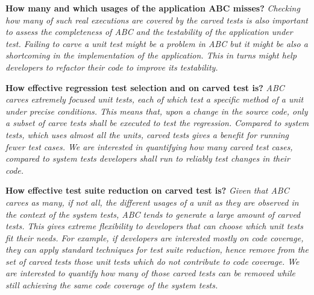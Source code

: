 \documentclass[10pt,conference]{IEEEtran}
\newcommand{\abc}{\textsf{ABC}\xspace}
\begin{document}
\begin{RQ}
\textbf{How many and which usages of the application \abc misses?}
\emph{Checking how many of such real executions are covered by the carved tests is also
important to assess the completeness of \abc and the testability of the application under test.
Failing to carve a unit test might be a problem in \abc but it might be also a shortcoming in the
implementation of the application. This in turns might help developers to refactor their code to 
improve its testability.}
\end{RQ}
\begin{RQ}
\textbf{How effective regression test selection and on carved test is?}
\emph{\abc carves extremely focused unit tests, each of which test a specific method of a unit
under precise conditions. This means that, upon a change in the source code, only 
a subset of carve tests shall be executed to test the regression.  Compared to system tests,
which uses almost all the units, carved tests gives a benefit for running fewer test cases.
%
We are interested in quantifying how many carved test cases, compared to system tests
developers shall run to reliably test changes in their code.}
\end{RQ}
\begin{RQ}
\textbf{How effective test suite reduction on carved test is?}
\emph{Given that \abc carves as many, if not all, the different usages of a unit as they are observed
in the context of the system tests, \abc tends to generate a large amount of carved tests. 
This gives extreme flexibility to developers that can choose which unit tests fit their needs.
For example, 
if developers are interested \emph{mostly} on code coverage, 
they can apply standard techniques for test suite reduction, hence remove from the set of
carved tests those unit tests which do not contribute to code coverage.
We are interested to quantify how many of those carved tests can be removed
while still achieving the same code coverage of the system tests.}
\end{RQ}


\end{document}
